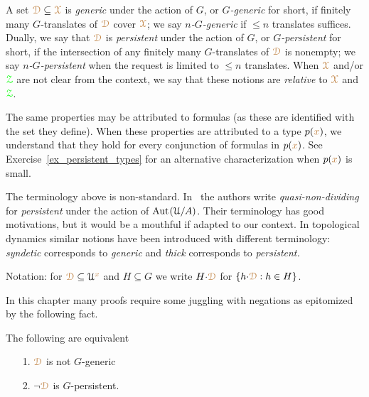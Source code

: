
A set ${\color{brown}\EuScript D}\subseteq{\color{brown}\EuScript X}$ is \emph{generic\/} under the action of $G$, or \emph{$G$-generic\/} for short, if finitely many $G$-translates of ${\color{brown}\EuScript D}$ cover ${\color{brown}\EuScript X}$; we say \emph{$n$-$G$-generic\/} if $\le n$ translates suffices.
Dually, we say that ${\color{brown}\EuScript D}$ is \emph{persistent\/} under the action of $G$, or \emph{$G$-persistent\/} for short, if the intersection of any finitely many $G$-translates of ${\color{brown}\EuScript D}$ is nonempty; we say \emph{$n$-$G$-persistent\/} when the request is limited to $\le n$ translates.
When ${\color{brown}\EuScript X}$ and/or ${\color{green}\EuScript Z}$ are not clear from the context, we say that these notions are \emph{relative\/} to ${\color{brown}\EuScript X}$ and ${\color{green}\EuScript Z}$.

The same properties may be attributed to formulas (as these are identified with the set they define).
When these properties are attributed to a type $p({\color{brown} x})$, we understand that they hold for every conjunction of formulas in $p({\color{brown} x})$.
See Exercise~\ref{ex_persistent_types} for an alternative characterization when $p({\color{brown} x})$ is small.

\noindent\llap{\textcolor{red}{\Large\warning}\kern1.5ex}\ignorespaces
The terminology above is non-standard.
In~\cite{CK} the authors write \textit{quasi-non-dividing\/} for \textit{persistent\/} under the action of ${\rm Aut\kern.15ex}(\EuScript U/A)$.
Their terminology has good motivations, but it would be a mouthful if adapted to our context.
In topological dynamics similar notions have been introduced with different terminology: \textit{syndetic\/} corresponds to \textit{generic\/} and \textit{thick\/} corresponds to \textit{persistent.}

Notation: for ${\color{brown}\EuScript D}\subseteq\EuScript U^{\color{brown} x}$ and $H\subseteq G$ we write \emph{$H{\cdot}{\color{brown}\EuScript D}$\/} for $\{h{\cdot}{\color{brown}\EuScript D}: h\in H\}$.

In this chapter many proofs require some juggling with negations as epitomized by the following fact.

\begin{fact}\label{fact_fip}
  The following are equivalent
  \begin{itemize}
    \item[1.] ${\color{brown}\EuScript D}$ is not $G$-generic
    \item[2.] $\neg{\color{brown}\EuScript D}$ is $G$-persistent.
  \end{itemize}
\end{fact}


